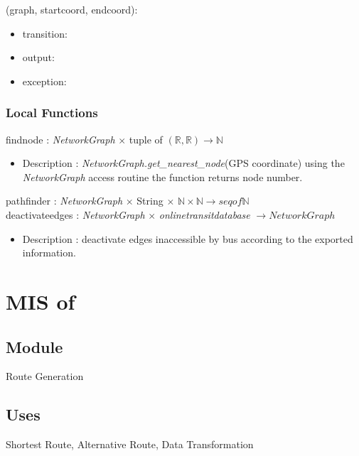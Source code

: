 \documentclass[12pt, titlepage]{article}
\begin{document}
\noindent {}(graph, startcoord, endcoord):
\begin{itemize}
\item transition:  
\item output:  
\item exception:  
\end{itemize}

\subsubsection{Local Functions}

findnode : \emph{NetworkGraph} $\times$ tuple of $(\mathbb{R}, \mathbb{R})  \rightarrow \mathbb{N}$
\begin{itemize}
    \item Description : \emph{NetworkGraph.get\_nearest\_node}(GPS coordinate) using the \emph{NetworkGraph} access routine the function returns node number.
\end{itemize}
pathfinder : \emph{NetworkGraph} $\times$ String $\times$ $\mathbb{N} \times \mathbb{N}  \rightarrow seq of \mathbb{N}$\\
deactivateedges : \emph{NetworkGraph} $\times$ \emph{onlinetransitdatabase} $ \rightarrow NetworkGraph$
\begin{itemize}
    \item Description : deactivate edges inaccessible by bus according to the exported information.
\end{itemize}
\newpage

\section{MIS of } \label{ModuleSPath} 

\subsection{Module} 
Route Generation

\subsection{Uses}%
Shortest Route, Alternative Route, Data Transformation
\end{document}
